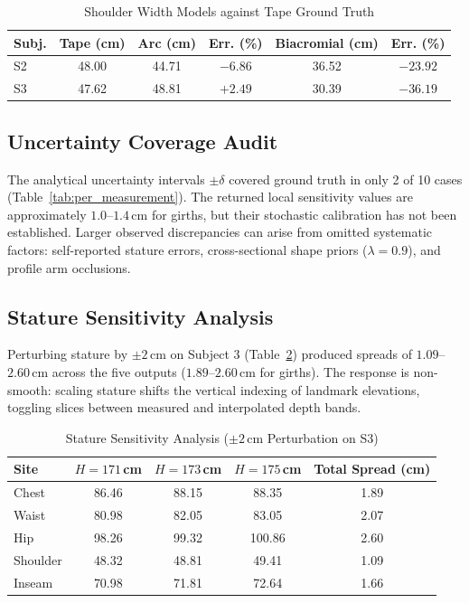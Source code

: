 \documentclass[journal]{IEEEtran}
\begin{document}
\begin{table}[!t]
\caption{Shoulder Width Models against Tape Ground Truth}
\label{tab:shoulder_comparison}
\centering
\begin{tabular}{lccccc}
\toprule
\textbf{Subj.} & \textbf{Tape (cm)} & \textbf{Arc (cm)} & \textbf{Err. (\%)} & \textbf{Biacromial (cm)} & \textbf{Err. (\%)} \\
\midrule
S2 & 48.00 & 44.71 & $-6.86$ & 36.52 & $-23.92$ \\
S3 & 47.62 & 48.81 & $+2.49$ & 30.39 & $-36.19$ \\
\bottomrule
\end{tabular}
\end{table}

\subsection{Uncertainty Coverage Audit}
\label{subsec:coverage_analysis}
The analytical uncertainty intervals $\pm \delta$ covered ground truth in only 2 of 10 cases (Table~\ref{tab:per_measurement}). The returned local sensitivity values are approximately $1.0$--$1.4$\,cm for girths, but their stochastic calibration has not been established. Larger observed discrepancies can arise from omitted systematic factors: self-reported stature errors, cross-sectional shape priors ($\lambda=0.9$), and profile arm occlusions.

\subsection{Stature Sensitivity Analysis}
Perturbing stature by $\pm 2$\,cm on Subject 3 (Table~\ref{tab:stature_pert}) produced spreads of $1.09$--$2.60$\,cm across the five outputs ($1.89$--$2.60$\,cm for girths). The response is non-smooth: scaling stature shifts the vertical indexing of landmark elevations, toggling slices between measured and interpolated depth bands.

\begin{table}[!t]
\caption{Stature Sensitivity Analysis ($\pm 2$\,cm Perturbation on S3)}
\label{tab:stature_pert}
\centering
\begin{tabular}{lcccc}
\toprule
\textbf{Site} & $H=171$\,cm & $H=173$\,cm & $H=175$\,cm & \textbf{Total Spread (cm)} \\
\midrule
Chest & 86.46 & 88.15 & 88.35 & 1.89 \\
Waist & 80.98 & 82.05 & 83.05 & 2.07 \\
Hip & 98.26 & 99.32 & 100.86 & 2.60 \\
Shoulder & 48.32 & 48.81 & 49.41 & 1.09 \\
Inseam & 70.98 & 71.81 & 72.64 & 1.66 \\
\bottomrule
\end{tabular}
\end{table}
\end{document}
